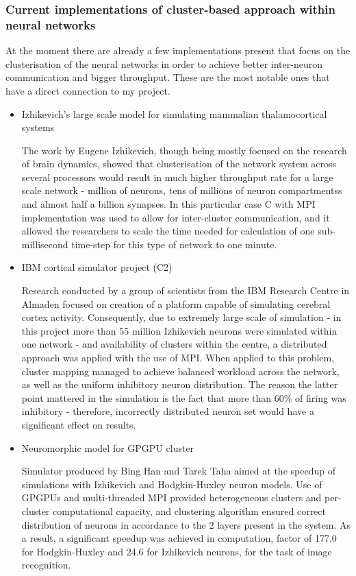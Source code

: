 \subsubsection{Current implementations of cluster-based approach within neural networks}
At the moment there are already a few implementations present that focus on the clusterisation of the neural networks in order to achieve better inter-neuron communication and bigger throughput. 
These are the most notable ones that have a direct connection to my project.

\begin{itemize}
\item{Izhikevich's large scale model for simulating mammalian thalamocortical systems}

The work by Eugene Izhikevich\cite{EugeneM.Izhikevich2008}, though being mostly focused on the research of brain dynamics, showed that clusterisation of the network system across several processors would result in much higher throughput rate for a large scale network - million of neurons, tens of millions of neuron compartmentss and almost half a billion synapses. In this particular case C with MPI implementation was used to allow for inter-cluster communication, and it allowed the researchers to scale the time needed for calculation of one sub-millisecond time-step for this type of network to one minute.

\item{IBM cortical simulator project (C2)}

Research conducted by a group of scientists from the IBM Research Centre in Almaden\cite{DharmendraS.Modha2007} focused on creation of a platform capable of simulating cerebral cortex activity. Consequently, due to extremely large scale of simulation - in this project more than 55 million Izhikevich neurons were simulated within one network - and availability of clusters within the centre, a distributed approach was applied with the use of MPI. When applied to this problem, cluster mapping managed to achieve balanced workload across the network, as well as the uniform inhibitory neuron distribution. The reason the latter point mattered in the simulation is the fact that more than 60\% of firing was inhibitory - therefore, incorrectly distributed neuron set would have a significant effect on results.

\item{Neuromorphic model for GPGPU cluster}

Simulator produced by Bing Han and Tarek Taha aimed at the speedup of simulations with Izhikevich and Hodgkin-Huxley neuron models\cite{TarekM.Taha2010}. Use of GPGPUs and multi-threaded MPI provided heterogeneous  clusters and per-cluster computational capacity, and clustering algorithm ensured correct distribution of neurons in accordance to the 2 layers present in the system. As a result, a significant speedup was achieved in computation, factor of 177.0 for Hodgkin-Huxley and 24.6 for Izhikevich neurons, for the task of image recognition.
\end{itemize}
